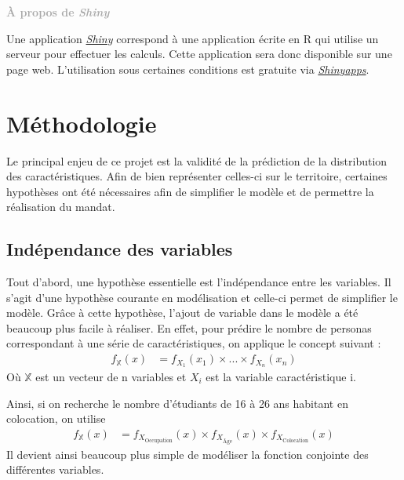 \documentclass[11pt,french]{article}\usepackage[]{graphicx}\usepackage[]{color}
\newenvironment{moreInfo}[1]
	{\begin{mdframed}
	\textcolor{darkgray}{\huge \raisebox{-3.5pt}{\faInfo} 
	\hspace{0.5cm} \large\bfseries #1}\\[5pt]
	\normalsize
	\makebox[0.1\textwidth][l]{}	
	\begin{minipage}{10cm}}
	{	\end{minipage}
	\end{mdframed}}
\begin{document}
\begin{moreInfo}{\color{Gray}À propos de \emph{Shiny}
     \color{black}}
     Une application \href{https://shiny.rstudio.com}{\emph{Shiny}} correspond à une application écrite en R qui utilise un serveur pour effectuer les calculs. Cette application sera donc disponible sur une page web. L'utilisation sous certaines conditions est gratuite via  \href{https://www.shinyapps.io}{\emph{Shinyapps}}.
\end{moreInfo}

\section{Méthodologie}

Le principal enjeu de ce projet est la validité de la prédiction de la distribution des caractéristiques. Afin de bien représenter celles-ci sur le territoire, certaines hypothèses ont été nécessaires afin de simplifier le modèle et de permettre la réalisation du mandat.
\newline

\subsection{Indépendance des variables}

Tout d'abord, une hypothèse essentielle est l'indépendance entre les variables. Il s'agit d'une hypothèse courante en modélisation et celle-ci permet de simplifier le modèle. Grâce à cette hypothèse, l'ajout de variable dans le modèle a été beaucoup plus facile à réaliser. En effet, pour prédire le nombre de personas correspondant à une série de caractéristiques, on applique le concept suivant :
\begin{align*}
f_{\mathbb{X}}(x) &= f_{X_1}(x_1) \times ... \times f_{X_n}(x_n)
\end{align*}
Où $\mathbb{X}$ est un vecteur de n variables et $X_i$ est la variable caractéristique i.
\newline

Ainsi, si on recherche le nombre d'étudiants de 16 à 26 ans habitant en colocation, on utilise 
\begin{align*}
f_{\mathbb{X}}(x) &= f_{X_{\text{Occupation}}}(x) \times f_{X_{\text{Âge}}}(x) \times f_{X_{\text{Colocation}}}(x)
\end{align*}
Il devient ainsi beaucoup plus simple de modéliser la fonction conjointe des différentes variables. 
\newline
\end{document}
